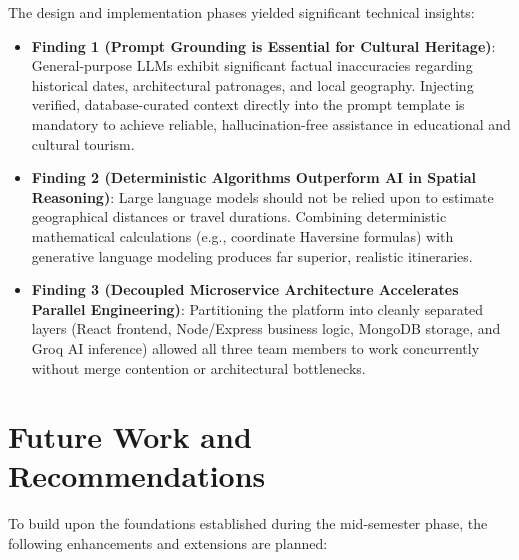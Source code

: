 \documentclass[12pt,a4paper,twoside,openright]{report}
\begin{document}
The design and implementation phases yielded significant technical insights:

\begin{itemize}[leftmargin=*]
    \item \textbf{Finding 1 (Prompt Grounding is Essential for Cultural Heritage)}: General-purpose LLMs exhibit significant factual inaccuracies regarding historical dates, architectural patronages, and local geography. Injecting verified, database-curated context directly into the prompt template is mandatory to achieve reliable, hallucination-free assistance in educational and cultural tourism.
    \item \textbf{Finding 2 (Deterministic Algorithms Outperform AI in Spatial Reasoning)}: Large language models should not be relied upon to estimate geographical distances or travel durations. Combining deterministic mathematical calculations (e.g., coordinate Haversine formulas) with generative language modeling produces far superior, realistic itineraries.
    \item \textbf{Finding 3 (Decoupled Microservice Architecture Accelerates Parallel Engineering)}: Partitioning the platform into cleanly separated layers (React frontend, Node/Express business logic, MongoDB storage, and Groq AI inference) allowed all three team members to work concurrently without merge contention or architectural bottlenecks.
\end{itemize}

\section{Future Work and Recommendations}

To build upon the foundations established during the mid-semester phase, the following enhancements and extensions are planned:
\end{document}
